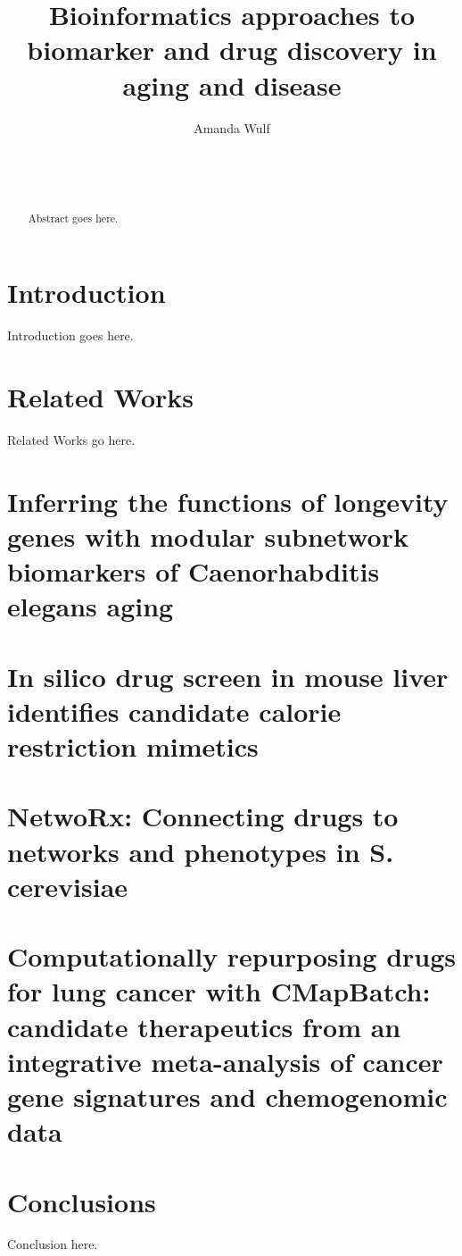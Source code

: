 \documentclass{sig-alternate-05-2015}
\begin{document}
\title{Bioinformatics approaches to biomarker and drug discovery in aging and disease}
\author{
\alignauthor
Amanda Wulf\\
       \\
       \\
       \\
}
\maketitle
\begin{abstract}
Abstract goes here.
\end{abstract}

\section{Introduction}
Introduction goes here.

\section{Related Works}
Related Works go here.

\section{Inferring the functions of longevity genes with modular subnetwork biomarkers of Caenorhabditis elegans aging}

\section{In silico drug screen in mouse liver identifies candidate calorie restriction mimetics}

\section{NetwoRx: Connecting drugs to networks and phenotypes in S. cerevisiae}

\section{Computationally repurposing drugs for lung cancer with CMapBatch: candidate therapeutics from an integrative meta-analysis of cancer gene signatures and chemogenomic data}

\section{Conclusions}
Conclusion here.
\end{document}
